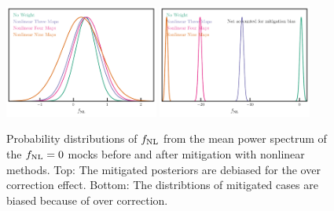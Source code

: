 \begin{figure}
\centering
\includegraphics[width=0.45\textwidth]{figures/mcmc_cont.pdf}
\includegraphics[width=0.45\textwidth]{figures/mcmc_contnoshift.pdf}
\caption{Probability distributions of $f_{\rm NL}$ from the mean power spectrum of the $f_{\rm NL}=0$ mocks before and after mitigation with nonlinear methods. Top: The mitigated posteriors are debiased for the over correction effect. Bottom: The distribtions of mitigated cases are biased because of over correction.}\label{fig:contmcmc}
\end{figure}




